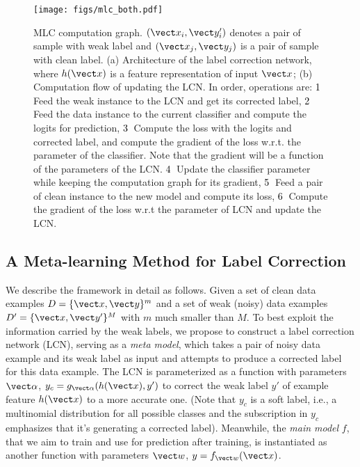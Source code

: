 \begin{figure}[t]
  \centering
  \texttt{[image: figs/mlc\_both.pdf]}
    \caption{ MLC computation graph. $(\vect x_i, \vect y_i')$ denotes a
      pair of sample with weak label and $(\vect x_j, \vect y_j)$ is a
      pair of sample with clean label. (a) Architecture of the label
      correction network, where $h(\vect x)$ is a feature
      representation of input $\vect x$; (b) Computation flow of
      updating the LCN. In order, operations are:
      \textcolor{black}{\textcircled{1}} Feed the weak instance to the
      LCN and get its corrected label,
      \textcolor{black}{\textcircled{2}} Feed the data instance to the
      current classifier and compute the logits for prediction,
      \textcolor{black}{\textcircled{3}} Compute the loss with the
      logits and corrected label, and compute the gradient of the loss
      w.r.t. the parameter of the classifier. Note that the
      gradient will be a function of the parameters of the LCN.
      \textcolor{black}{\textcircled{4}} Update the classifier
      parameter while keeping the computation graph for its gradient,
      \textcolor{black}{\textcircled{5}} Feed a pair of clean instance
      to the new model and compute its loss,
      \textcolor{black}{\textcircled{6}} Compute the gradient of the
      loss w.r.t the parameter of LCN and update the LCN.}
    \label{fig:model}
\end{figure}





\subsection{A Meta-learning Method for Label Correction}
We describe the framework in detail as follows. Given a set of clean
data examples $D=\{\vect x,\vect y\}^m$ and a set of weak (noisy) data
examples $D'=\{\vect x, \vect y'\}^M$ with $m$ much smaller than
$M$. To best exploit the information carried by the weak labels, we
propose to construct a label correction network (LCN), serving as a
\textit{meta model}, which takes a pair of noisy data example and its
weak label as input and attempts to produce a corrected label for this
data example. The LCN is parameterized as a function with parameters
$\vect \alpha$, $y_c=g_{\vect \alpha}(h(\vect x), y')$ to correct the
weak label $y'$ of example feature $h(\vect x)$ to a more accurate one. (Note
that $y_c$ is a soft label, i.e., a multinomial distribution for all possible classes and the subscription in $y_c$ emphasizes that it's generating a
corrected label). Meanwhile, the \textit{main model} $f$, that we aim
to train and use for prediction after training, is instantiated as
another function with parameters $\vect w$, $y=f_{\vect w}(\vect x)$.

